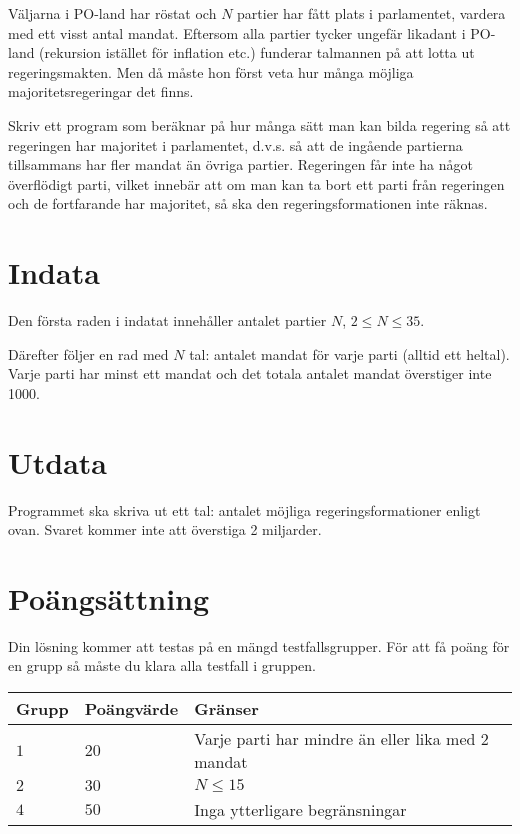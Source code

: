 
Väljarna i PO-land har röstat och $N$ partier har fått plats i parlamentet, vardera med ett
visst antal mandat. Eftersom alla partier tycker ungefär likadant i PO-land (rekursion
istället för inflation etc.) funderar talmannen på att lotta ut regeringsmakten. Men då
måste hon först veta hur många möjliga majoritetsregeringar det finns.

Skriv ett program som beräknar på hur många sätt man kan bilda regering så att regeringen
har majoritet i parlamentet, d.v.s. så att de ingående partierna tillsammans har
fler mandat än övriga partier. Regeringen får inte ha något överflödigt parti, vilket innebär
att om man kan ta bort ett parti från regeringen och de fortfarande har majoritet,
så ska den regeringsformationen inte räknas.

\section*{Indata}

Den första raden i indatat innehåller antalet partier $N$, $2 \le N \le 35$.

Därefter följer en rad med $N$ tal: antalet mandat för varje parti (alltid ett heltal).
Varje parti har minst ett mandat och det totala antalet mandat överstiger inte 1000.

\section*{Utdata}

Programmet ska skriva ut ett tal: antalet möjliga regeringsformationer enligt ovan.
Svaret kommer inte att överstiga 2 miljarder.

\section*{Poängsättning}
Din lösning kommer att testas på en mängd testfallsgrupper.
För att få poäng för en grupp så måste du klara alla testfall i gruppen.

\noindent
\begin{tabular}{| l | l | p{12cm} |}
  \hline
  Grupp & Poängvärde & Gränser \\ \hline
  $1$   & $20$       & Varje parti har mindre än eller lika med $2$ mandat \\ \hline
  $2$   & $30$       & $N \leq 15$ \\ \hline
  $4$   & $50$       & Inga ytterligare begränsningar  \\ \hline
\end{tabular}
